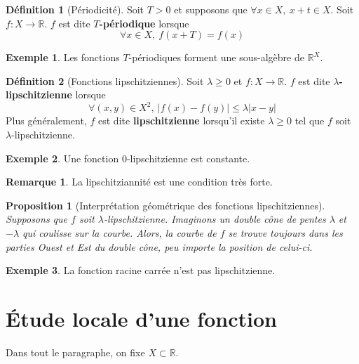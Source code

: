 \documentclass[french]{book}
\newcommand{\R}{\mathbb{R}}
\theoremstyle{plain}
\newtheorem{prop}{Proposition}[chapter]
\theoremstyle{definition}
\newtheorem{dfn}{Définition}[chapter]
\newtheorem{exa}{Exemple}[chapter]
\newtheorem{rmq}{Remarque}[chapter]
\theoremstyle{remark}
\begin{document}
\begin{dfn}[Périodicité]
	Soit $T>0$ et supposons que $\forall x\in X,\ x+t\in X$. Soit $f:X\rightarrow\R$. $f$ est dite \textbf{$T$-périodique} lorsque $$\forall x\in X,\ f(x+T)=f(x)$$
\end{dfn}
\begin{exa}
	Les fonctions $T$-périodiques forment une sous-algèbre de $\R^X$.
\end{exa}
\begin{dfn}[Fonctions lipschitziennes]
	Soit $\lambda\geqslant0$ et $f:X\rightarrow\R$. $f$ est dite \textbf{$\lambda$-lipschitzienne} lorsque $$\forall(x,y)\in X^2,\ \lvert f(x)-f(y)\rvert\leqslant\lambda\lvert x-y\rvert$$ Plus généralement, $f$ est dite \textbf{lipschitzienne} lorsqu'il existe $\lambda\geqslant0$ tel que $f$ soit $\lambda$-lipschitzienne. 
\end{dfn}
\begin{exa}
	Une fonction $0$-lipschitzienne est constante.
\end{exa}
\begin{rmq}
	La lipschitziannité est une condition très forte.
\end{rmq}
\begin{prop}[Interprétation géométrique des fonctions lipschitziennes]
	Supposons que $f$ soit $\lambda$-lipschitzienne. Imaginons un double cône de pentes $\lambda$ et $-\lambda$ qui coulisse sur la courbe. Alors, la courbe de $f$ se trouve toujours dans les parties Ouest et Est du double cône, peu importe la position de celui-ci.
\end{prop}
\begin{exa}
	La fonction racine carrée n'est pas lipschitzienne.
\end{exa}
\section{Étude locale d'une fonction}
Dans tout le paragraphe, on fixe $X\subset\R$.
\end{document}
